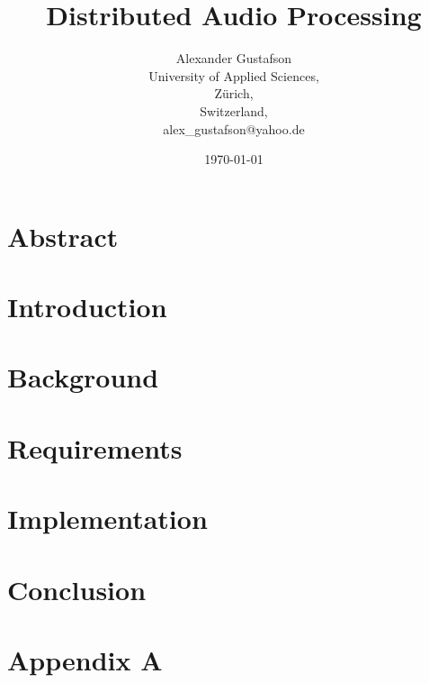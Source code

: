 \documentclass{report}
\begin{document}
\title{Distributed Audio Processing}
\author{Alexander Gustafson\\
  University of Applied Sciences,\\
  Zürich,\\
  Switzerland,\\
  alex\_gustafson@yahoo.de}
\date{\today}
\maketitle

\chapter*{Abstract}



\tableofcontents

\chapter{Introduction}



\chapter{Background}






\chapter{Requirements}







\chapter{Implementation}











\chapter{Conclusion}




{}


\chapter{Appendix A}



\end{document}
